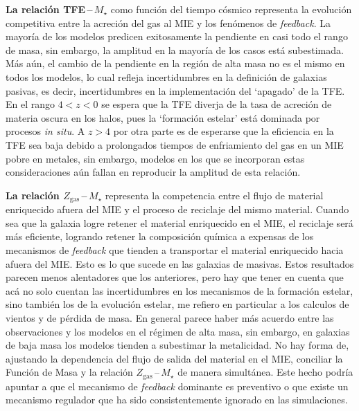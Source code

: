 \documentclass{article}
\begin{document}
\begin{description}
\textbf{La relación TFE\,--\,$M_\star$} como función del tiempo cósmico representa la evolución
competitiva entre la acreción del gas al MIE y los fenómenos de \emph{feedback}. La mayoría de los
modelos predicen exitosamente la pendiente en casi todo el rango de masa, sin embargo, la amplitud
en la mayoría de los casos está subestimada. Más aún, el cambio de la pendiente en la región de alta
masa no es el mismo en todos los modelos, lo cual refleja incertidumbres en la definición de
galaxias pasivas, es decir, incertidumbres en la implementación del `apagado' de la TFE. En el rango
$4<z<0$ se espera que la TFE diverja de la tasa de acreción de materia oscura en los halos,
pues la `formación estelar' está dominada por procesos \emph{in situ}. A $z>4$ por otra parte es de
esperarse que la eficiencia en la TFE sea baja debido a prolongados tiempos de enfriamiento del gas
en un MIE pobre en metales, sin embargo, modelos en los que se incorporan estas consideraciones aún
fallan en reproducir la amplitud de esta relación.

\textbf{La relación $Z_\text{gas}\,$--$\,M_\star$} representa la competencia entre el flujo de
material enriquecido afuera del MIE y el proceso de reciclaje del mismo material. Cuando sea que la
galaxia logre retener el material enriquecido en el MIE, el reciclaje será más eficiente, logrando
retener la composición química a expensas de los mecanismos de \emph{feedback} que tienden a
transportar el material enriquecido hacia afuera del MIE. Esto es lo que sucede en las galaxias de
masivas.
Estos resultados parecen menos alentadores que los anteriores, pero hay que tener en cuenta que acá
no solo cuentan las incertidumbres en los mecanismos de la formación estelar, sino también los de la
evolución estelar, me refiero en particular a los calculos de vientos y de pérdida de masa. En
general parece haber más acuerdo entre las observaciones y los modelos en el régimen de alta masa,
sin embargo, en galaxias de baja masa los modelos tienden a subestimar la metalicidad. No hay forma
de, ajustando la dependencia del flujo de salida del material en el MIE, conciliar la Función de
Masa y la relación $Z_\text{gas}\,$--$\,M_\star$ de manera simultánea. Este hecho podría apuntar a
que el mecanismo de \emph{feedback} dominante es preventivo o que existe un mecanismo regulador que
ha sido consistentemente ignorado en las simulaciones.


\end{description}
\end{document}
